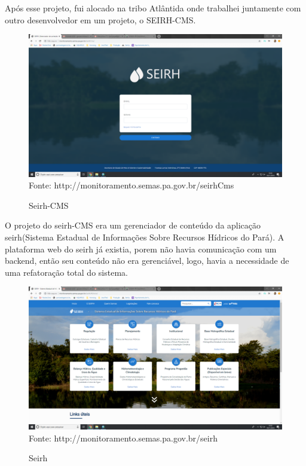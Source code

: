 Após esse projeto, fui alocado na tribo Atlântida onde trabalhei juntamente com outro desenvolvedor em um projeto, o SEIRH-CMS.

\begin{figure}[H]
\centering
\caption{Seirh-CMS} %
\includegraphics[scale=0.22]{seirh-cms}\\  %
{\small Fonte: http://monitoramento.semas.pa.gov.br/seirhCms} %
\label{fig:exemplo} %
\end{figure}

O projeto do seirh-CMS era um gerenciador de conteúdo da aplicação seirh(Sistema Estadual de Informações Sobre Recursos Hídricos do Pará).
A plataforma web do seirh já existia, porem não havia comunicação com um backend, então seu conteúdo não era gerenciável, logo, havia a necessidade de uma refatoração total do sistema.

\begin{figure}[H]
\centering
\caption{Seirh} %
\includegraphics[scale=0.22]{seirh}\\  %
{\small Fonte: http://monitoramento.semas.pa.gov.br/seirh} %
\label{fig:exemplo} %
\end{figure}

